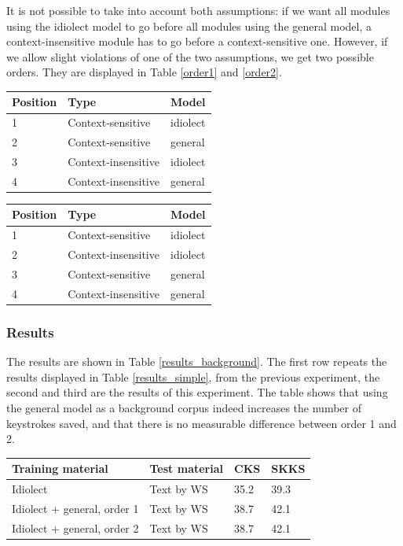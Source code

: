 \documentclass[11pt]{article}
\let\originaltable\table
\let\endoriginaltable\endtable
\renewenvironment{table}[1][ht]{%
  \originaltable[#1]
  \centering}%
  {\endoriginaltable}
\begin{document}
It is not possible to take into account both assumptions: if we want all modules using the idiolect model to go before all modules using the general model, a context-insensitive module has to go before a context-sensitive one. However, if we allow slight violations of one of the two assumptions, we get two possible orders. They are displayed in Table \ref{order1} and \ref{order2}. 

\begin{table}[H]
\begin{tabular}{lll} 
Position&Type&Model\\
\hline
1&Context-sensitive&idiolect\\
2&Context-sensitive&general\\
3&Context-insensitive&idiolect\\
4&Context-insensitive&general\\
\end{tabular} 
\caption{Module order with the general model as background model, version 1} \label{order1}
\end{table}

\begin{table}[H]
\begin{tabular}{lll} 
Position&Type&Model\\
\hline
1&Context-sensitive&idiolect\\
2&Context-insensitive&idiolect\\
3&Context-sensitive&general\\
4&Context-insensitive&general\\
\end{tabular} 
\caption{Module order with the general model as background model, version 2} \label{order2}
\end{table}

\subsubsection{Results}

The results are shown in Table \ref{results_background}. The first row repeats the results displayed in Table \ref{results_simple}, from the previous experiment, the second and third are the results of this experiment. The table shows that using the general model as a background corpus indeed increases the number of keystrokes saved, and that there is no measurable difference between order 1 and 2.

\begin{table}[H]
\begin{tabular}{ll|ll} 
Training material&Test material&CKS&SKKS\\
\hline
Idiolect&Text by WS&35.2&39.3\\
Idiolect + general, order 1&Text by WS&38.7&42.1\\
Idiolect + general, order 2&Text by WS&38.7&42.1\\
\end{tabular} 
\caption{Percentage of keystrokes that can be saved when using the general model as background model} \label{results_background}
\end{table}
\end{document}
